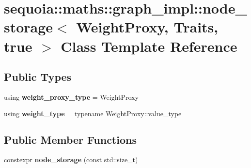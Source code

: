 \hypertarget{classsequoia_1_1maths_1_1graph__impl_1_1node__storage_3_01_weight_proxy_00_01_traits_00_01true_01_4}{}\section{sequoia\+::maths\+::graph\+\_\+impl\+::node\+\_\+storage$<$ Weight\+Proxy, Traits, true $>$ Class Template Reference}
\label{classsequoia_1_1maths_1_1graph__impl_1_1node__storage_3_01_weight_proxy_00_01_traits_00_01true_01_4}
\subsection*{Public Types}
\begin{DoxyCompactItemize}
\item 
\mbox{\label{classsequoia_1_1maths_1_1graph__impl_1_1node__storage_3_01_weight_proxy_00_01_traits_00_01true_01_4_a632518a8c02675ca326fb084c2519779}} 
using {\bfseries weight\+\_\+proxy\+\_\+type} = Weight\+Proxy
\item 
\mbox{\label{classsequoia_1_1maths_1_1graph__impl_1_1node__storage_3_01_weight_proxy_00_01_traits_00_01true_01_4_a9d4079ea823a3754c8572ffb19d8d228}} 
using {\bfseries weight\+\_\+type} = typename Weight\+Proxy\+::value\+\_\+type
\end{DoxyCompactItemize}
\subsection*{Public Member Functions}
\begin{DoxyCompactItemize}
\item 
\mbox{\label{classsequoia_1_1maths_1_1graph__impl_1_1node__storage_3_01_weight_proxy_00_01_traits_00_01true_01_4_adc93753ca1350996abfc9ebd4a2e4fa4}} 
constexpr {\bfseries node\+\_\+storage} (const std\+::size\+\_\+t)
\end{DoxyCompactItemize}
